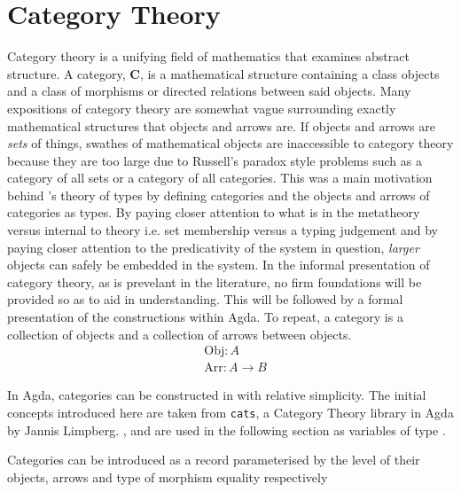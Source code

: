 \section{Category Theory}

Category theory is a unifying field of mathematics that examines abstract
structure. A category, \textbf{C}, is a mathematical structure containing a
class objects and a class of morphisms or directed relations between said
objects. Many expositions of category theory are somewhat vague surrounding
exactly mathematical structures that objects and arrows are. If objects and
arrows are \textit{sets} of things, swathes of mathematical objects are
inaccessible to category theory because they are too large due to Russell's
paradox style problems such as a category of all sets or a category of all
categories. This was a main motivation behind \mlt's theory of types by
defining categories and the objects and arrows of categories as types. By paying
closer attention to what is in the metatheory versus internal to theory i.e. set
membership versus a typing judgement and by paying closer attention to the
predicativity of the system in question, \textit{larger} objects can safely be
embedded in the system. In the informal presentation of
category theory, as is prevelant in the literature, no firm foundations will be
provided so as to aid in understanding. This will be followed by a formal
presentation of the constructions within Agda. To repeat, a category is a
collection of objects and a collection of arrows between objects.
\begin{align*}
    &\textrm{Obj} : A \\
    &\textrm{Arr} : A \rightarrow B
\end{align*}

In Agda, categories can be constructed in with relative simplicity. The initial
concepts introduced here are taken from \verb|cats|, a Category Theory library
in Agda by Jannis Limpberg. ,  and 
are used in the following section as variables of type .

Categories can be introduced as a record parameterised by the level of their
objects, arrows and type of morphism equality respectively


